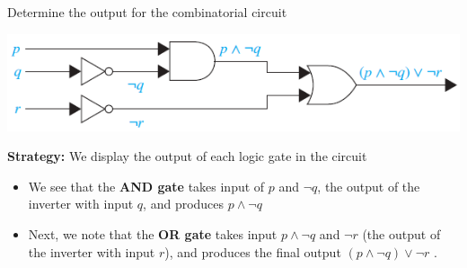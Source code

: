 \begin{tcolorbox}[title=Example 1: Output for the combinatorial circuit]
Determine the output for the combinatorial circuit
\begin{center}
    \includegraphics[width=0.6\linewidth]{chp1_2_applogic/comb1.png}
\end{center}
\textbf{Strategy:}
We display the output of each logic gate in the circuit
\begin{itemize}
    \item We see that the \textbf{AND gate} takes input of $p$ and $\neg q$, the output of the inverter with input $q$, and produces $p \land \neg q$
    \item Next, we note that the \textbf{OR gate} takes input $p \land \neg q$ and $\neg r$ (the output of the inverter with
input $r$), and produces the final output $(p \land \neg q) \lor \neg r$ .
\end{itemize}
\end{tcolorbox}

